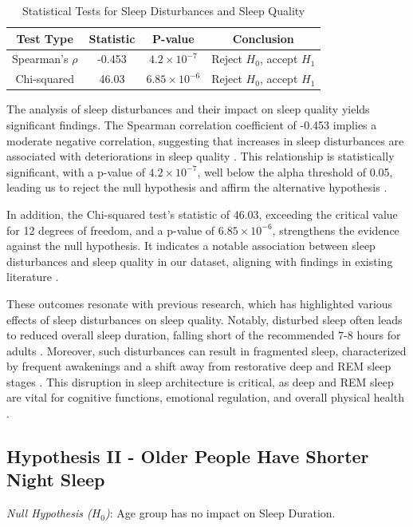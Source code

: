 \documentclass[conference]{IEEEtran}
\begin{document}
      \begin{table}[ht]
      \centering
      \caption{Statistical Tests for Sleep Disturbances and Sleep Quality}
      \label{tab:hypothesis1}
      \begin{tabular}{|c|c|c|c|}
      \hline
      \textbf{Test Type} & \textbf{Statistic} & \textbf{P-value} & \textbf{Conclusion} \\
      \hline
      Spearman's \(\rho\) & -0.453 & \(4.2 \times 10^{-7}\) & Reject \(H_0\), accept \(H_1\)
      \\
      \hline
      Chi-squared & 46.03 & \(6.85 \times 10^{-6}\) & Reject \(H_0\), accept \(H_1\)
      \\
      \hline
      \end{tabular}
      \end{table}
      The analysis of sleep disturbances and their impact on sleep quality yields significant findings. The Spearman correlation coefficient of -0.453 implies a moderate negative correlation, suggesting that increases in sleep disturbances are associated with deteriorations in sleep quality \cite{alhola2007sleep}. This relationship is statistically significant, with a p-value of \(4.2 \times 10^{-7}\), well below the alpha threshold of 0.05, leading us to reject the null hypothesis and affirm the alternative hypothesis \cite{morin2003cognitive}.

In addition, the Chi-squared test's statistic of 46.03, exceeding the critical value for 12 degrees of freedom, and a p-value of \(6.85 \times 10^{-6}\), strengthens the evidence against the null hypothesis. It indicates a notable association between sleep disturbances and sleep quality in our dataset, aligning with findings in existing literature \cite{riemann2014pharmacological}.

These outcomes resonate with previous research, which has highlighted various effects of sleep disturbances on sleep quality. Notably, disturbed sleep often leads to reduced overall sleep duration, falling short of the recommended 7-8 hours for adults \cite{morin2003cognitive}. Moreover, such disturbances can result in fragmented sleep, characterized by frequent awakenings and a shift away from restorative deep and REM sleep stages \cite{alhola2007sleep}. This disruption in sleep architecture is critical, as deep and REM sleep are vital for cognitive functions, emotional regulation, and overall physical health \cite{riemann2014pharmacological}.

      \subsection*{Hypothesis II - Older People Have Shorter Night Sleep}
\textit{Null Hypothesis (\(H_0\))}: Age group has no impact on Sleep Duration.
\end{document}
